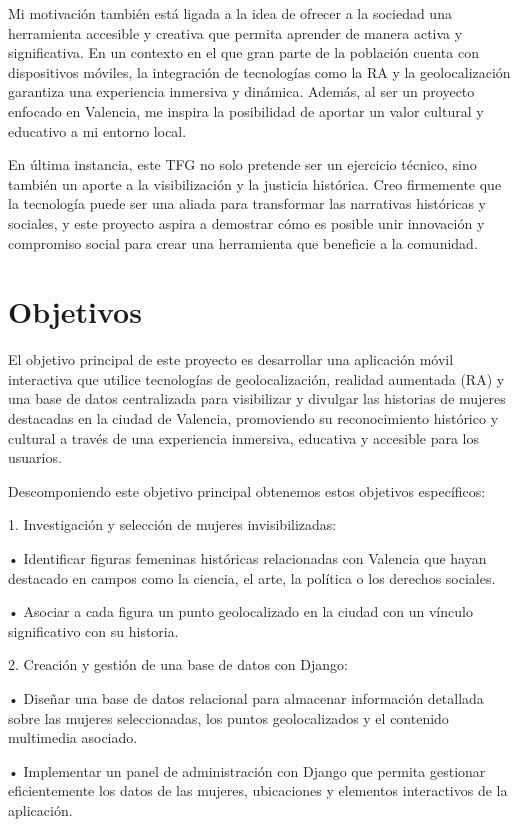 Mi motivación también está ligada a la idea de ofrecer a la sociedad una herramienta accesible y creativa que permita aprender de manera activa y significativa. En un contexto en el que gran parte de la población cuenta con dispositivos móviles, la integración de tecnologías como la RA y la geolocalización garantiza una experiencia inmersiva y dinámica. Además, al ser un proyecto enfocado en Valencia, me inspira la posibilidad de aportar un valor cultural y educativo a mi entorno local.

En última instancia, este TFG no solo pretende ser un ejercicio técnico, sino también un aporte a la visibilización y la justicia histórica. Creo firmemente que la tecnología puede ser una aliada para transformar las narrativas históricas y sociales, y este proyecto aspira a demostrar cómo es posible unir innovación y compromiso social para crear una herramienta que beneficie a la comunidad.

\section{Objetivos}
El objetivo principal de este proyecto es desarrollar una aplicación móvil interactiva que utilice tecnologías de geolocalización, realidad aumentada (RA) y una base de datos centralizada para visibilizar y divulgar las historias de mujeres destacadas en la ciudad de Valencia, promoviendo su reconocimiento histórico y cultural a través de una experiencia inmersiva, educativa y accesible para los usuarios.

Descomponiendo este objetivo principal obtenemos estos objetivos específicos:

	1.	Investigación y selección de mujeres invisibilizadas:
    
	•	Identificar figuras femeninas históricas relacionadas con Valencia que hayan destacado en campos como la ciencia, el arte, la política o los derechos sociales.
    
	•	Asociar a cada figura un punto geolocalizado en la ciudad con un vínculo significativo con su historia.
    
	2.	Creación y gestión de una base de datos con Django:
    
	•	Diseñar una base de datos relacional para almacenar información detallada sobre las mujeres seleccionadas, los puntos geolocalizados y el contenido multimedia asociado.
    
	•	Implementar un panel de administración con Django que permita gestionar eficientemente los datos de las mujeres, ubicaciones y elementos interactivos de la aplicación.
    
